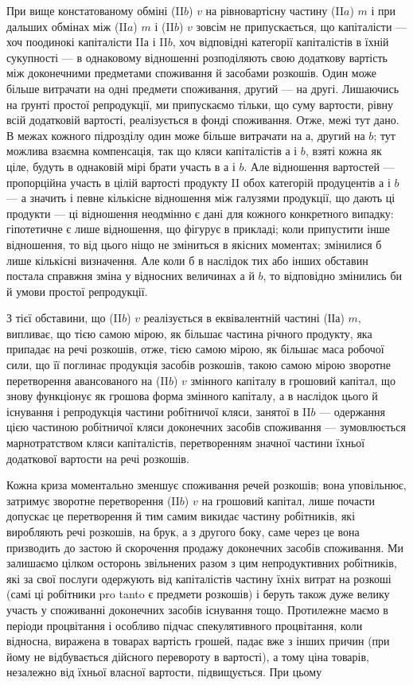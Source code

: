 При вище констатованому обміні (II$b$) $v$ на рівновартісну частину
(II$a$) $m$ і при дальших обмінах між (II$a$) $m$ і (II$b$) $v$ зовсім не припускається,
що капіталісти — хоч поодинокі капіталісти II$а$ і II$b$, хоч відповідні
категорії капіталістів в їхній сукупності — в однаковому відношенні
розподіляють свою додаткову вартість між доконечними предметами споживання
й засобами розкошів. Один може більше витрачати на одні
предмети споживання, другий — на другі. Лишаючись на ґрунті простої
репродукції, ми припускаємо тільки, що суму вартости, рівну всій додатковій
вартості, реалізується в фонді споживання. Отже, межі тут
дано. В межах кожного підрозділу один може більше витрачати на $а$,
другий на $b$; тут можлива взаємна компенсація, так що кляси капіталістів
$а$ і $b$, взяті кожна як ціле, будуть в однаковій мірі брати участь
в $а$ і $b$. Але відношення вартостей — пропорційна участь в цілій вартості
продукту II обох категорій продуцентів $а$ і $b$ — а значить і певне кількісне
відношення між галузями продукції, що дають ці продукти — ці
відношення неодмінно є дані для кожного конкретного випадку: гіпотетичне
є лише відношення, що фігурує в прикладі; коли припустити
інше відношення, то від цього ніщо не зміниться в якісних моментах;
змінилися б лише кількісні визначення. Але коли б в наслідок тих або
інших обставин постала справжня зміна у відносних величинах $а$ й $b$, то
відповідно змінились би й умови простої репродукції.

З тієї обставини, що (II$b$) $v$ реалізується в еквівалентній частині
(ІІ$а$) $m$, випливає, що тією самою мірою, як більшає частина річного
продукту, яка припадає на речі розкошів, отже, тією самою мірою, як
більшає маса робочої сили, що її поглинає продукція засобів розкошів,
такою самою мірою зворотне перетворення авансованого на (II$b$) $v$
змінного капіталу в грошовий капітал, що знову функціонує як грошова
форма змінного капіталу, а в наслідок цього й існування і репродукція
частини робітничої кляси, занятої в II$b$ — одержання цією частиною робітничої
кляси доконечних засобів споживання — зумовлюється марнотратством
кляси капіталістів, перетворенням значної частини їхньої додаткової
вартости на речі розкошів.

Кожна криза моментально зменшує споживання речей розкошів; вона
уповільнює, затримує зворотне перетворення (II$b$) $v$ на грошовий капітал,
лише почасти допускає це перетворення й тим самим викидає частину робітників,
які виробляють речі розкошів, на брук, а з другого боку, саме через
це вона призводить до застою й скорочення продажу доконечних засобів
споживання. Ми залишаємо цілком осторонь звільнених разом з цим
непродуктивних робітників, які за свої послуги одержують від капіталістів
частину їхніх витрат на розкоші (самі ці робітники pro tanto є
предмети розкошів) і беруть також дуже велику участь у споживанні
доконечних засобів існування тощо. Протилежне маємо в періоди процвітання
і особливо підчас спекулятивного процвітання, коли відносна,
виражена в товарах вартість грошей, падає вже з інших причин (при
йому не відбувається дійсного перевороту в вартості), а тому ціна товарів,
незалежно від їхньої власної вартости, підвищується. При цьому
\parbreak{}  %
